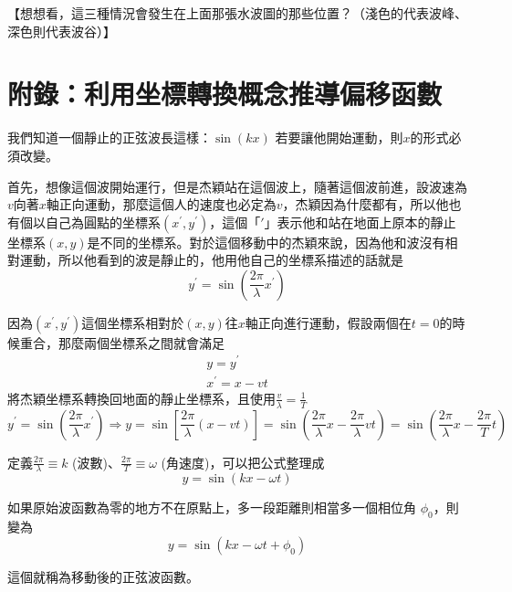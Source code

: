 {\Kai 【想想看，這三種情況會發生在上面那張水波圖的那些位置？（淺色的代表波峰、深色則代表波谷）】}





\section{附錄：利用坐標轉換概念推導偏移函數}


我們知道一個靜止的正弦波長這樣：$\sin⁡ \left (kx\right )$
若要讓他開始運動，則$x$的形式必須改變。

首先，想像這個波開始運行，但是杰穎站在這個波上，隨著這個波前進，設波速為$v$向著$x$軸正向運動，那麼這個人的速度也必定為$v$，杰穎因為什麼都有，所以他也有個以自己為圓點的坐標系$(x^{\prime}, y^{\prime})$，這個「$\prime$」表示他和站在地面上原本的靜止坐標系$(x,y)$是不同的坐標系。對於這個移動中的杰穎來說，因為他和波沒有相對運動，所以他看到的波是靜止的，他用他自己的坐標系描述的話就是
$$
y^{\prime}=\sin \left(\frac{2 \pi}{\lambda} x^{\prime}\right)
$$

因為$(x^{\prime}, y^{\prime})$這個坐標系相對於$(x,y)$往$x$軸正向進行運動，假設兩個在$t=0$的時候重合，那麼兩個坐標系之間就會滿足
$$
\begin{array}{c}{y=y^{\prime}} \\ {x^{\prime}=x-v t}\end{array}
$$
將杰穎坐標系轉換回地面的靜止坐標系，且使用$\frac{v}{\lambda}=\frac{1}{T}$
$$
y^{\prime}=\sin \left(\frac{2 \pi}{\lambda} x^{\prime}\right) \Rightarrow y=\sin \left[\frac{2 \pi}{\lambda}(x-v t)\right]=\sin \left(\frac{2 \pi}{\lambda} x-\frac{2 \pi}{\lambda} v t\right)=\sin \left(\frac{2 \pi}{\lambda} x-\frac{2 \pi}{T} t\right)
$$

定義$\frac{2\pi}{\lambda}\equiv k$ (波數)、$\frac{2\pi}{T} \equiv \omega$ (角速度)，可以把公式整理成
$$
y=\sin (k x-\omega t)
$$

如果原始波函數為零的地方不在原點上，多一段距離則相當多一個相位角 $\phi_0$，則變為
$$
y=\sin \left(k x-\omega t+\phi_{0}\right)
$$

這個就稱為移動後的正弦波函數。
